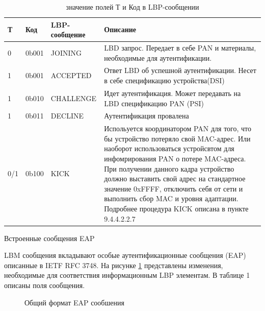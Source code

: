 \begin{longtable}[\textwidth]{|p{}|p{}|p{}|p{}|}
\caption{значение полей Т и Код в LBP-сообщении} \\ %
\hline
Т & Код & LBP-сообщение & Описание \\ \hline
0 & 0b001 & JOINING & LBD запрос. Передает в себе PAN и материалы, необходимые для аутентификации. \\ \hline
1 & 0b001 & ACCEPTED & Ответ LBD об успешной аутентификации. Несет в себе спецификацию устройства(DSI) \\ \hline
1 & 0b010 & CHALLENGE & Идет аутентификация. Может передавать на LBD спецификацию PAN (PSI) \\ \hline
1 & 0b011 & DECLINE & Аутентификация провалена \\ \hline
0/1 & 0b100 & KICK & Испольуется координатором PAN для того, что бы устройство потеряло свой MAC-адрес. Или наоборот использоваться устройсвтом для инфомрирования PAN о потере MAC-адреса. При получении данного кадра устройство должно выставить свой адрес на стандартное значение 0xFFFF, отключить себя от сети и выполнить сбор MAC и уровня адаптации. Подробнее процедура KICK описана в пункте 9.4.4.2.2.7 \\ \hline
\end{longtable}

Встроенные сообщения EAP %

LBM сообщения вкладывают особые аутентификационные сообщения (EAP) описанные в IETF RFC 3748. На рисунке \ref{img:9-23} представлены изменения, необходимые для соответствия информационным LBP элементам. В таблице 1 описаны поля сообщения.  %

\begin{figure}[h]
 \label{img:9-23}
 \caption{Общий формат EAP сообшения}
\end{figure}

